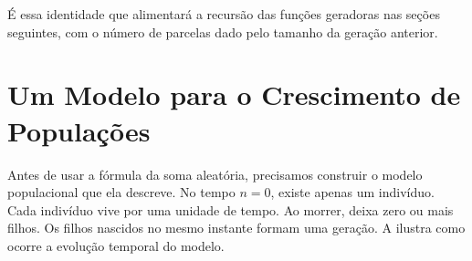 \documentclass[12pt,portuguese]{article}
\theoremstyle{definition}
\theoremstyle{plainexercise}
\theoremstyle{starredexercise}
\theoremstyle{definition}
\begin{document}
É essa identidade que alimentará a recursão das funções geradoras nas seções
seguintes, com o número de parcelas dado pelo tamanho da geração anterior.

\section{Um Modelo para o Crescimento de Populações}\label{sec:modelo-populacao}

Antes de usar a fórmula da soma aleatória, precisamos construir o modelo
populacional que ela descreve. No tempo $n=0$, existe apenas um indivíduo.
Cada indivíduo vive por uma unidade de tempo. Ao morrer, deixa zero ou mais
filhos. Os filhos nascidos no mesmo instante formam uma geração. A
 ilustra como ocorre a evolução temporal do modelo.


\newcommand{\arvoreciclodevida}[1]{%
  \foreach \nome/\pai/\geracao/\posicao in {
    g0/raiz/0/0,
    g1a/g0/1/-2, g1b/g0/1/2,
    g2a/g1a/2/-3.8, g2b/g1a/2/-2, g2c/g1a/2/-0.2, g2d/g1b/2/2,
    g3a/g2b/3/-2.8, g3b/g2b/3/-1.2, g3c/g2c/3/-0.2,
    g4a/g3a/4/-3.4, g4b/g3a/4/-2.2, g4c/g3b/4/-1.2, g4d/g3c/4/-0.2,
    g5a/g4b/5/-2.2, g5b/g4d/5/-0.75, g5c/g4d/5/0.35
  } {
    \ifnum\geracao>#1\relax
    \else
      \def\opacidade{0.16}
      \def\espessura{0.6pt}
      \ifnum\geracao=#1\relax
        \def\opacidade{1}
        \def\espessura{0.8pt}
      \fi
      \node[vertice ramificacao, opacity=\opacidade]
        (\nome) at (\posicao, -\geracao) {};
      \ifnum\geracao>0\relax
        \draw[aresta ramificacao, line width=\espessura, opacity=\opacidade]
          (\pai) -- (\nome);
      \fi
    \fi
  }%
}
\end{document}
